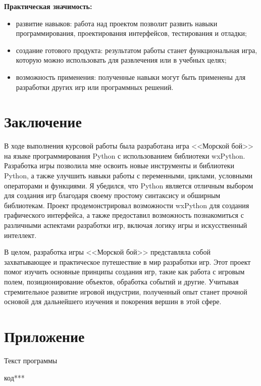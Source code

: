 \documentclass[14pt, oneside]{altsu-report}
\begin{document}
\textbf{Практическая значимость:}
\begin{itemize}
\item развитие навыков: работа над проектом позволит развить навыки программирования, проектирования интерфейсов, тестирования и отладки;
\item создание готового продукта: результатом работы станет функциональная игра, которую можно использовать для развлечения или в учебных целях;
\item возможность применения: полученные навыки могут быть применены для разработки других игр или программных решений.
\end{itemize}




\chapter*{Заключение}
В ходе выполнения курсовой работы была разработана игра <<Морской бой>> на языке программирования Python с использованием библиотеки wxPython. Разработка игры позволила мне освоить новые инструменты и библиотеки Python, а также улучшить навыки работы с переменными, циклами, условными операторами и функциями. Я убедился, что Python является отличным выбором для создания игр благодаря своему простому синтаксису и обширным библиотекам. Проект продемонстрировал возможности wxPython для создания графического интерфейса, а также предоставил возможность познакомиться с различными аспектами разработки игр, включая логику игры и искусственный интеллект.

В целом, разработка игры <<Морской бой>> представляла собой захватывающее и практическое путешествие в мир разработки игр. Этот проект помог изучить основные принципы создания игр, такие как работа с игровым полем, позиционирование объектов, обработка событий и другие. Учитывая стремительное развитие игровой индустрии, полученный опыт станет прочной основой для дальнейшего изучения и покорения вершин в этой сфере.
\newpage
{}
\printbibliography[title={Список использованной литературы}]
\nocite{*}

\appendix
\newpage
\chapter*{\raggedleft\label{appendix1}Приложение}

\begin{center}
\label{code:appendix}Текст программы
\end{center}
\begin{code}
код***
\end{code}
\end{document}
